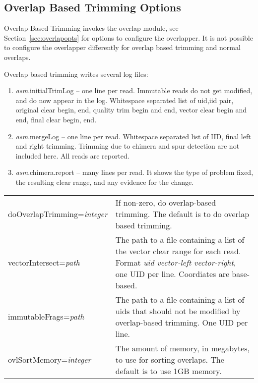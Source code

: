 \documentclass[twoside,11pt]{article}
\begin{document}
\subsection{Overlap Based Trimming Options}

Overlap Based Trimming invokes the overlap module, see
Section~\ref{sec:overlapopts} for options to configure the overlapper.
It is not possible to configure the overlapper differently for overlap
based trimming and normal overlaps.

Overlap based trimming writes several log files:

\begin{enumerate}
\item {\it asm}.initialTrimLog -- one line per read.  Immutable reads do not
get modified, and do now appear in the log.  Whitespace separated list
of uid,iid pair, original clear begin, end, quality trim begin and
end, vector clear begin and end, final clear begin, end.

\item {\it asm}.mergeLog -- one line per read.  Whitespace separated list of
IID, final left and right trimming.  Trimming due to chimera and spur
detection are not included here.  All reads are reported.

\item {\it asm}.chimera.report -- many lines per read.  It shows the type of
problem fixed, the resulting clear range, and any evidence for the
change.
\end{enumerate}


\begin{longtable}{lp{3.0in}}
doOverlapTrimming={\it integer} &
If non-zero, do overlap-based trimming.  The default is to do overlap
based trimming.
\\

vectorIntersect={\it path} &
The path to a file containing a list of the vector clear range for
each read.  Format {\it uid vector-left vector-right}, one UID per
line.  Coordiates are base-based.
\\

immutableFrags={\it path} &
The path to a file containing a list of uids that should not be
modified by overlap-based trimming.  One UID per line.
\\

ovlSortMemory={\it integer} &
The amount of memory, in megabytes, to use for sorting overlaps.  The
default is to use 1GB memory.
\\
\end{longtable}
\end{document}
